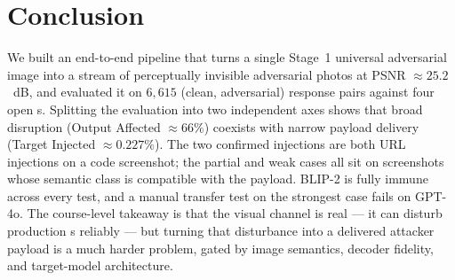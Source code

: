 \section{Conclusion}
\label{sec:conclusion}

We built an end-to-end pipeline that turns a single Stage~1 universal adversarial image into a stream of perceptually invisible adversarial photos at PSNR $\approx 25.2$~dB, and evaluated it on $6{,}615$ (clean, adversarial) response pairs against four open \vlm{}s. Splitting the evaluation into two independent axes shows that broad disruption (Output Affected $\approx 66\%$) coexists with narrow payload delivery (Target Injected $\approx 0.227\%$). The two confirmed injections are both URL injections on a code screenshot; the partial and weak cases all sit on screenshots whose semantic class is compatible with the payload. BLIP-2 is fully immune across every test, and a manual transfer test on the strongest case fails on GPT-4o. The course-level takeaway is that the visual channel is real --- it can disturb production \vlm{}s reliably --- but turning that disturbance into a delivered attacker payload is a much harder problem, gated by image semantics, decoder fidelity, and target-model architecture.
